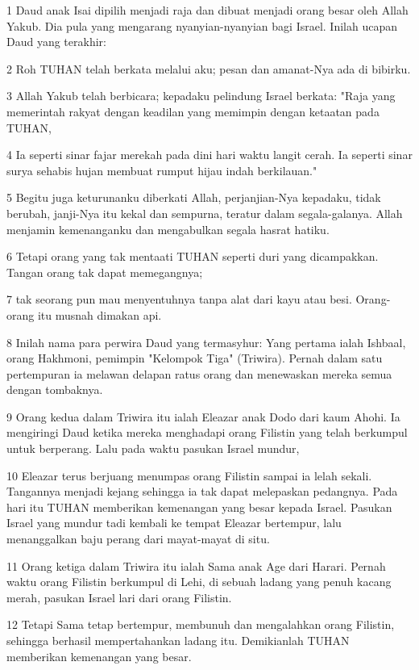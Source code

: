 \par 1 Daud anak Isai dipilih menjadi raja dan dibuat menjadi orang besar oleh Allah Yakub. Dia pula yang mengarang nyanyian-nyanyian bagi Israel. Inilah ucapan Daud yang terakhir:
\par 2 Roh TUHAN telah berkata melalui aku; pesan dan amanat-Nya ada di bibirku.
\par 3 Allah Yakub telah berbicara; kepadaku pelindung Israel berkata: "Raja yang memerintah rakyat dengan keadilan yang memimpin dengan ketaatan pada TUHAN,
\par 4 Ia seperti sinar fajar merekah pada dini hari waktu langit cerah. Ia seperti sinar surya sehabis hujan membuat rumput hijau indah berkilauan."
\par 5 Begitu juga keturunanku diberkati Allah, perjanjian-Nya kepadaku, tidak berubah, janji-Nya itu kekal dan sempurna, teratur dalam segala-galanya. Allah menjamin kemenanganku dan mengabulkan segala hasrat hatiku.
\par 6 Tetapi orang yang tak mentaati TUHAN seperti duri yang dicampakkan. Tangan orang tak dapat memegangnya;
\par 7 tak seorang pun mau menyentuhnya tanpa alat dari kayu atau besi. Orang-orang itu musnah dimakan api.
\par 8 Inilah nama para perwira Daud yang termasyhur: Yang pertama ialah Ishbaal, orang Hakhmoni, pemimpin "Kelompok Tiga" (Triwira). Pernah dalam satu pertempuran ia melawan delapan ratus orang dan menewaskan mereka semua dengan tombaknya.
\par 9 Orang kedua dalam Triwira itu ialah Eleazar anak Dodo dari kaum Ahohi. Ia mengiringi Daud ketika mereka menghadapi orang Filistin yang telah berkumpul untuk berperang. Lalu pada waktu pasukan Israel mundur,
\par 10 Eleazar terus berjuang menumpas orang Filistin sampai ia lelah sekali. Tangannya menjadi kejang sehingga ia tak dapat melepaskan pedangnya. Pada hari itu TUHAN memberikan kemenangan yang besar kepada Israel. Pasukan Israel yang mundur tadi kembali ke tempat Eleazar bertempur, lalu menanggalkan baju perang dari mayat-mayat di situ.
\par 11 Orang ketiga dalam Triwira itu ialah Sama anak Age dari Harari. Pernah waktu orang Filistin berkumpul di Lehi, di sebuah ladang yang penuh kacang merah, pasukan Israel lari dari orang Filistin.
\par 12 Tetapi Sama tetap bertempur, membunuh dan mengalahkan orang Filistin, sehingga berhasil mempertahankan ladang itu. Demikianlah TUHAN memberikan kemenangan yang besar.
